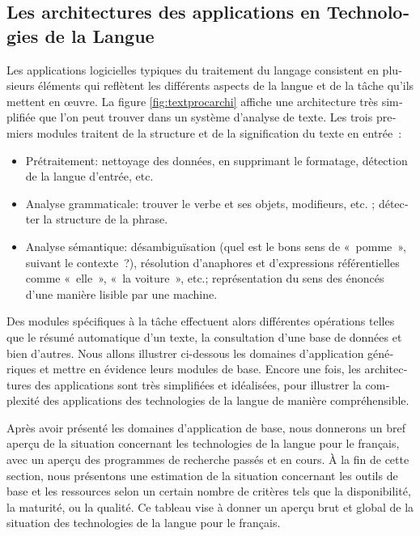 \begin{french}
\begin{multicols}{2}
\subsection{Les architectures des applications en Technologies de la Langue}

Les applications logicielles typiques du traitement du langage
consistent en plusieurs éléments qui reflètent les différents aspects
de la langue et de la tâche qu'ils mettent en œuvre. La figure \ref{fig:textprocarchi}  
 affiche une architecture très simplifiée que l'on peut trouver
dans un système d'analyse de texte. Les trois premiers modules
traitent de la structure et de la signification du texte en entrée~:
\begin{itemize}
\item Prétraitement: nettoyage des données, en supprimant le
  formatage, détection de la langue d'entrée, etc.

\item Analyse grammaticale: trouver le verbe et ses objets,
  modifieurs, etc. ; détecter la structure de la phrase.

\item Analyse sémantique: désambiguïsation (quel est le bons sens de
  «~pomme~», suivant le contexte~?), résolution d'anaphores et
  d'expressions référentielles comme «~elle~», «~la voiture~», etc.;
  représentation du sens des énoncés d'une manière lisible par une
  machine.
\end{itemize}

Des modules spécifiques à la tâche effectuent alors différentes
opérations telles que le résumé automatique d'un texte, la
consultation d'une base de données et bien d'autres. Nous allons
illustrer ci-dessous les domaines d'application génériques et mettre
en évidence leurs modules de base. Encore une fois, les architectures
des applications sont très simplifiées et idéalisées, pour illustrer
la complexité des applications des technologies de la langue de
manière compréhensible.

Après avoir présenté les domaines d'application de base, nous
donnerons un bref aperçu de la situation concernant les technologies
de la langue pour le français, avec un aperçu des programmes de
recherche passés et en cours. À la fin de cette section, nous
présentons une estimation de la situation concernant les outils de
base et les ressources selon un certain nombre de critères tels que la
disponibilité, la maturité, ou la qualité. Ce tableau vise à donner un
aperçu brut et global de la situation des technologies de la langue
pour le français.


\end{multicols}
\end{french}
